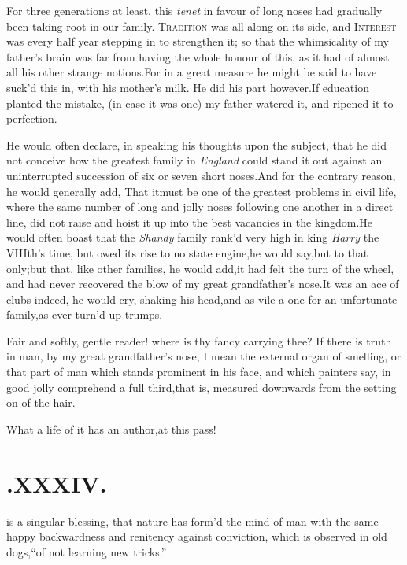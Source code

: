 \documentclass{article}
\begin{document}
For three generations at least, this \textit{te\-net} in favour of
long noses had gradually been taking root in our family.\tsh
\textsc{Tradition} was all along on its side, and
\textsc{Interest} was every half year stepping in to strengthen
it; so that the whimsicality of my father’s brain was far
from
having the whole honour of this, as it had of almost all his
other strange notions.\tsk For in a great measure he might be
said to have suck’d this in, with his mother’s milk. He did his
part however.\tsh If\break
education planted the mistake, (in case it was one) my father
watered it, and ri\-pened it to perfection.

He would often declare, in speaking his thoughts upon the
subject, that he did not conceive how the greatest family in
\textit{England} could stand it out against an uninterrupted
succession of six or seven short noses.\tsk And for the contrary
reason, he would generally add, That it\break must be one of
the greatest problems in civil life, where the same number of long
and jolly noses following one another in a direct line, did not
raise and hoist it up into the best vacancies in the
kingdom.\tsh He would often boast that the \textit{Shandy}
family rank’d very high in king \textit{Harry} the
VIIIth’s time, but owed its rise to no state engine,\tsk he
would say,\tsk but to that only;\tsh but that, like other
families, he would add,\tsh it had felt the turn of the
wheel, and had never recovered the blow of my
great grandfather’s nose.\tsh It was an ace of clubs
indeed, he would cry, shaking his head,\tsk and as vile a one for
an unfortunate family,\break as ever turn’d up trumps.

\tsh Fair and softly, gentle reader!\break
\tsh where is thy fancy carrying thee?\break
\tsh If there is truth in man, by my
great grandfather’s nose, I mean the external organ of smelling,
or that part of man which stands prominent in his
face,
\tsk and which painters say, in good jolly\break
{}\break
comprehend a full third,\tsh that is, measured
downwards from the setting on of the hair.\tsh

\tsh What a life of it has an author,\break at this pass!

\null
\section{.\quad  XXXIV.}

 is a singular blessing, that
nature has form’d the mind of man with the same happy
backwardness and renitency against conviction, which is observed in
old dogs,\tsk “of not learning new tricks.”
\end{document}
